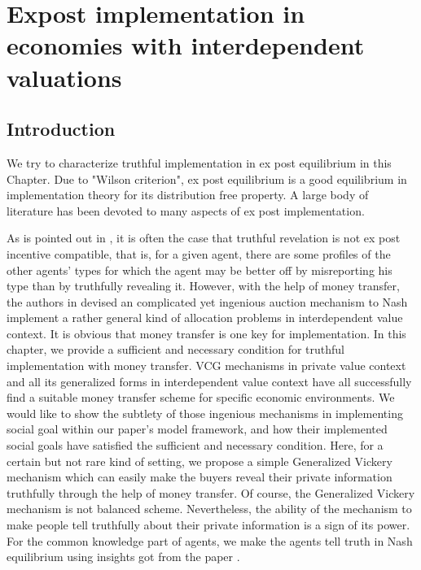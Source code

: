 
\chapter{Expost implementation in economies with  interdependent valuations}  %

\label{Chapter3} %




\section{Introduction}
 We try to characterize truthful implementation in ex post equilibrium in this Chapter.  Due to "Wilson criterion", ex post equilibrium 
 is a good equilibrium in implementation theory for its distribution free property. A large body of literature has been devoted to 
 many aspects of ex post implementation. 

 

 As is pointed out in \parencite{Postlewaite2014}, it is often the case that truthful revelation is not ex post incentive compatible, that is, for a given 
 agent, there are some profiles of the other agents' types for which the agent may be better off by misreporting his type than by 
 truthfully revealing it. However, with the help of money transfer, the authors in \parencite{Maskin00} devised an complicated yet ingenious 
 auction mechanism to Nash implement a rather general kind of allocation problems in interdependent value context. It is obvious 
 that money transfer is one key for implementation. 
 In this chapter, we provide a sufficient and necessary condition for truthful implementation with money transfer. VCG mechanisms in 
 private value context and all its generalized forms in interdependent value context have all successfully find a suitable
 money transfer scheme for specific economic environments. We would like to show the subtlety of those ingenious mechanisms in 
 implementing social goal within our paper's model framework, and how their implemented social goals have satisfied the sufficient and 
 necessary condition.
 Here, for a certain but not rare kind of setting, we propose a simple Generalized Vickery mechanism which can easily make the buyers
 reveal their private information truthfully through the help of money transfer. Of course, the Generalized Vickery mechanism is not 
 balanced scheme. Nevertheless, the ability of the mechanism to make people tell truthfully about their private information is a sign of 
 its power.   
 For the common knowledge part of agents, we make the agents tell truth in Nash equilibrium using insights got from the paper
 \parencite{Repullo90}.
 
